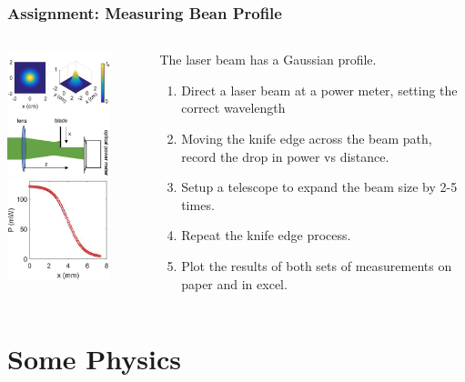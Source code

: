 \documentclass{beamer}
\begin{document}
\begin{frame}\frametitle{Assignment: Measuring Bean Profile}
\begin{columns}
\begin{column}{4cm}
\begin{center}
\includegraphics[width=3cm]{fig/profile1.jpg}
\includegraphics[width=3cm]{fig/profile2.jpg}
\end{center}
\end{column}
\begin{column}{7cm}
The laser beam has a Gaussian profile.
\begin{enumerate}
\item Direct a laser beam at a power meter, setting the correct wavelength
\item Moving the knife edge across the beam path, record the drop in power vs distance.
\item Setup a telescope to expand the beam size by 2-5 times.
\item Repeat the knife edge process.
\item Plot the results of both sets of measurements on paper and in excel.
\end{enumerate}
\end{column}
\end{columns}
\end{frame}


\section{Some Physics}
\end{document}
